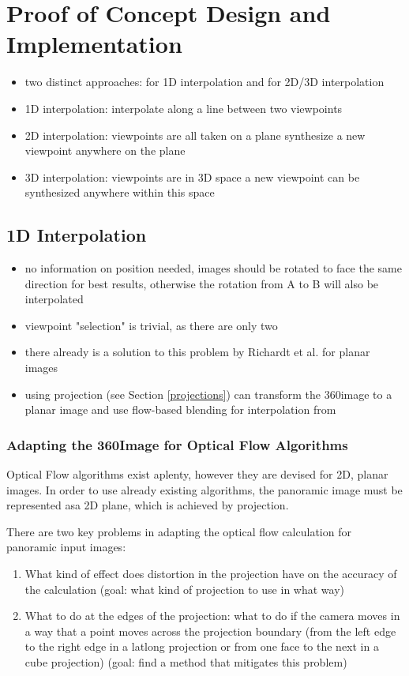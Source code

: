 \chapter{Proof of Concept Design and Implementation}
\begin{itemize}
\item two distinct approaches: for 1D interpolation and for 2D/3D interpolation
\item 1D interpolation: interpolate along a line between two viewpoints
\item 2D interpolation: viewpoints are all taken on a plane \ar synthesize a new viewpoint anywhere on the plane
\item 3D interpolation: viewpoints are in 3D space \ar a new viewpoint can be synthesized anywhere within this space
\end{itemize}


\section{1D Interpolation}
\begin{itemize}
\item no information on position needed, images should be rotated to face the same direction for best results, otherwise the rotation from A to B will also be interpolated
\item viewpoint "selection" is trivial, as there are only two
\item there already is a solution to this problem by Richardt et al. \cite{megastereo} for planar images
\item using projection (see Section \ref{projections}) can transform the 360\degree image to a planar image and use flow-based blending for interpolation from \cite{megastereo}
\end{itemize}

\subsection{Adapting the 360\degree Image for Optical Flow Algorithms}
Optical Flow algorithms exist aplenty, however they are devised for 2D, planar images. In order to use already existing algorithms, the panoramic image must be represented asa 2D plane, which is achieved by projection.

There are two key problems in adapting the optical flow calculation for panoramic input images:
\begin{enumerate}
\item What kind of effect does distortion in the projection have on the accuracy of the calculation (goal: what kind of projection to use in what way)
\item What to do at the edges of the projection: what to do if the camera moves in a way that a point moves across the projection boundary (from the left edge to the right edge in a latlong projection or from one face to the next in a cube projection) (goal: find a method that mitigates this problem)
\end{enumerate}

